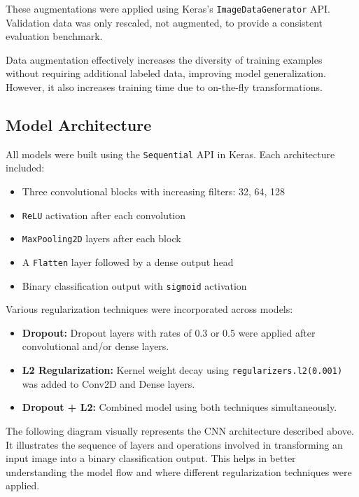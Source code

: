 \documentclass{article}
\begin{document}
These augmentations were applied using Keras’s \texttt{ImageDataGenerator} API. Validation data was only rescaled, not augmented, to provide a consistent evaluation benchmark.

Data augmentation effectively increases the diversity of training examples without requiring additional labeled data, improving model generalization. However, it also increases training time due to on-the-fly transformations.

\subsection{Model Architecture}

All models were built using the \texttt{Sequential} API in Keras. Each architecture included:

\begin{itemize}
    \item Three convolutional blocks with increasing filters: 32, 64, 128
    \item \texttt{ReLU} activation after each convolution
    \item \texttt{MaxPooling2D} layers after each block
    \item A \texttt{Flatten} layer followed by a dense output head
    \item Binary classification output with \texttt{sigmoid} activation
\end{itemize}

Various regularization techniques were incorporated across models:
\begin{itemize}
    \item \textbf{Dropout:} Dropout layers with rates of 0.3 or 0.5 were applied after convolutional and/or dense layers.
    \item \textbf{L2 Regularization:} Kernel weight decay using \texttt{regularizers.l2(0.001)} was added to Conv2D and Dense layers.
    \item \textbf{Dropout + L2:} Combined model using both techniques simultaneously.
\end{itemize}

\newpage

The following diagram visually represents the CNN architecture described above. It illustrates the sequence of layers and operations involved in transforming an input image into a binary classification output. This helps in better understanding the model flow and where different regularization techniques were applied.
\end{document}

